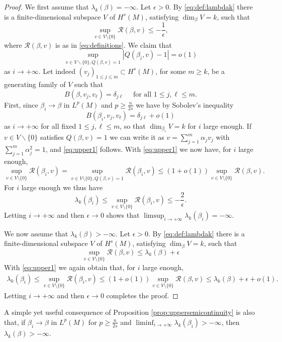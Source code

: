 \documentclass[10pt]{amsart}
\numberwithin{equation}{section}
\theoremstyle{plain}
\theoremstyle{remark}
\begin{document}
\begin{proof} We first assume that $\lambda_k(\beta) = -\infty$. Let $\epsilon>0$. By \eqref{eq:def:lambdak} there is a finite-dimensional subspace $V$ of $H^s(M)$, satisfying $\dim_{\beta} V = k$, such that %
$$ %
\sup_{v\in V\setminus \{0\}} \mathcal{R}(\beta,v) \leq -\frac{1}{\epsilon} ,$$
where $\mathcal{R}(\beta,v)$ is as in \eqref{eq:definitions}. We claim that %
\begin{equation} \label{eq:upper1}
 \sup_{v \in V \backslash \{0\}, Q(\beta,v) = 1 } \left\vert Q(\beta_i,v) - 1 \right\vert = o(1) 
 \end{equation}
as $i \to + \infty$. Let indeed $(v_j)_{1 \le j \le m} \subset H^s(M)$, for some $m \ge k$, be a generating family of $V$ such that 
$$B(\beta, v_j, v_\ell) = \delta_{j\ell} \quad \text{ for all }  1 \le j, \ell \le m.$$
First, since $\beta_i \to \beta$ in $L^p(M)$ and $p\ge \frac{n}{2s}$ we have by Sobolev's inequality 
$$B(\beta_i, v_j, v_\ell) = \delta_{j\ell} + o(1) $$ 
as $i \to + \infty$ for all fixed $1 \le j,\ell \le m$, so that $\dim_{\beta_i} V= k$ for $i$ large enough. If $v \in V \backslash \{0\}$ satisfies $Q(\beta,v) = 1$ we can write it as $v = \sum_{j=1}^m \alpha_j v_j$ with $\sum_{j=1}^m \alpha_j^2 = 1$, and \eqref{eq:upper1} follows. With \eqref{eq:upper1} we now have, for $i$ large enough,
$$\sup_{v\in V\setminus \{0\}} \mathcal{R}(\beta_i,v)  = \sup_{v\in V\setminus \{0\}, Q(\beta,v) = 1} \mathcal{R}(\beta_i,v) \le (1+o(1))\sup_{v\in V\setminus \{0\}} \mathcal{R}(\beta,v).$$
For $i$ large enough we thus have 
$$ \lambda_k(\beta_i) \leq \sup_{v\in V\setminus \{0\}}  \mathcal{R}(\beta_i,v) \leq -\frac{2}{\epsilon}. $$ %
Letting $i\to +\infty$ and then $\epsilon \to 0$ shows that $\limsup_{i \to + \infty} \lambda_k(\beta_i) = - \infty$. 

\medskip

We now assume that $\lambda_k(\beta) > -\infty$. Let $\epsilon>0$. By \eqref{eq:def:lambdak} there is a finite-dimensional subspace $V$ of $H^s(M)$, satisfying $\dim_{\beta} V = k$, such that
$$\sup_{v\in V\setminus \{0\}} \mathcal{R}(\beta,v) \leq \lambda_k(\beta) +\epsilon $$
With \eqref{eq:upper1} we again obtain that, for $i$ large enough, %
$$\begin{aligned}
 \lambda_k(\beta_i) \leq \sup_{v\in V\setminus \{0\}}  \mathcal{R}(\beta_i,v)  \le (1+o(1))\sup_{v\in V\setminus \{0\}} \mathcal{R}(\beta,v) \le \lambda_k(\beta)+\epsilon + o(1). %
 \end{aligned} $$ 
 Letting $i\to +\infty$ and then $\epsilon \to 0$ completes the proof.
\end{proof}
A simple yet useful consequence of Proposition \ref{prop:uppersemicontinuity} is also that, if $\beta_i \to \beta$ in $L^p(M)$ for $p \ge \frac{n}{2s}$ and $\liminf_{i \to + \infty} \lambda_k(\beta_i) > - \infty$, then $\lambda_k(\beta) > - \infty$. 
\end{document}

